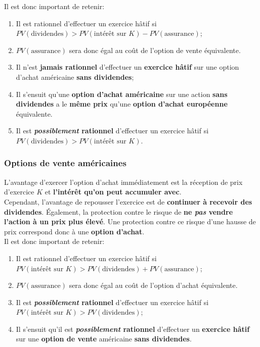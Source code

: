\documentclass[10pt, french]{article}
\begin{document}
\begin{multicols*}{2}
Il est donc important de retenir:
\begin{conceptgen}{}
\begin{enumerate}
	\item	Il est rationnel d'effectuer un exercice hâtif si\\
	 $PV(\text{dividendes}) > PV(\text{intérêt sur $K$}) - PV(\text{assurance})$;
 	\item[]	$PV(\text{assurance})$ sera donc égal au coût de l'option de vente équivalente.
	\item	Il n'est \textbf{jamais rationnel} d'effectuer un \textbf{exercice hâtif} sur une option d'achat américaine \textbf{sans dividendes};
	\item[]	Il s'ensuit qu'une \textbf{option d'achat américaine} sur une action \textbf{sans dividendes} a le \textbf{même prix} qu'une \textbf{option d'achat européenne} équivalente.
	\item	Il est \textbf{\textit{possiblement} rationnel} d'effectuer un exercice hâtif si \\
	$PV(\text{dividendes}) > PV(\text{intérêt sur $K$})$.
\end{enumerate}
\end{conceptgen}

\subsubsection*{Options de vente américaines}
L'avantage d'exercer l'option d'achat immédiatement est la réception de prix d'exercice $K$ et \textbf{l'intérêt qu'on peut accumuler avec}.\\

Cependant, l'avantage de repousser l'exercice est de \textbf{continuer à recevoir des dividendes}. Également, la protection contre le risque de \textbf{ne \textit{pas} vendre l'action à un prix plus élevé}. Une protection contre ce risque d'une hausse de prix correspond donc à une \textbf{option d'achat}.\\

Il est donc important de retenir:
\begin{conceptgen}{}
\begin{enumerate}
	\item	Il est rationnel d'effectuer un exercice hâtif si\\
	 $PV(\text{intérêt sur $K$}) > PV(\text{dividendes}) + PV(\text{assurance})$;
 	\item[]	$PV(\text{assurance})$ sera donc égal au coût de l'option d'achat équivalente.
	\item	Il est \textbf{\textit{possiblement} rationnel} d'effectuer un exercice hâtif si \\
	$PV(\text{intérêt sur $K$}) > PV(\text{dividendes})$;
	\item	Il s'ensuit qu'il est \textbf{\textit{possiblement} rationnel} d'effectuer un \textbf{exercice hâtif} sur une \textbf{option de vente} américaine \textbf{sans dividendes}.
\end{enumerate}
\end{conceptgen}



\end{multicols*}
\end{document}
